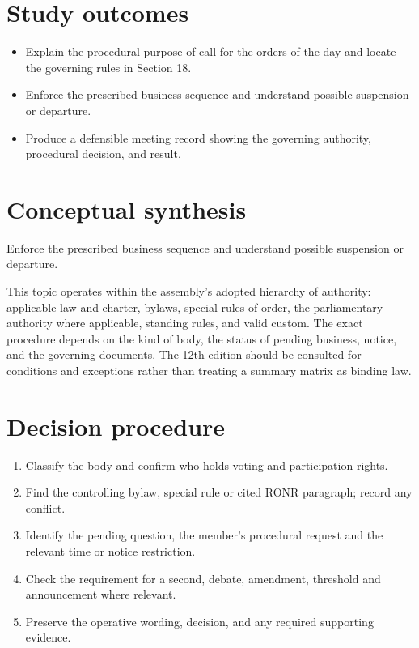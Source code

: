 \documentclass[11pt]{article}
\begin{document}
\SuiteOpen
{}
\section{Study outcomes}
\begin{itemize}[leftmargin=*,itemsep=4pt]
\item Explain the procedural purpose of call for the orders of the day and locate the governing rules in Section 18.
\item Enforce the prescribed business sequence and understand possible suspension or departure.
\item Produce a defensible meeting record showing the governing authority, procedural decision, and result.
\end{itemize}

\section{Conceptual synthesis}
Enforce the prescribed business sequence and understand possible suspension or departure.

This topic operates within the assembly’s adopted hierarchy of authority: applicable law and charter, bylaws, special rules of order, the parliamentary authority where applicable, standing rules, and valid custom. The exact procedure depends on the kind of body, the status of pending business, notice, and the governing documents. The 12th edition should be consulted for conditions and exceptions rather than treating a summary matrix as binding law.
\section{Decision procedure}
\begin{enumerate}[leftmargin=*,itemsep=4pt]
\item Classify the body and confirm who holds voting and participation rights.
\item Find the controlling bylaw, special rule or cited RONR paragraph; record any conflict.
\item Identify the pending question, the member’s procedural request and the relevant time or notice restriction.
\item Check the requirement for a second, debate, amendment, threshold and announcement where relevant.
\item Preserve the operative wording, decision, and any required supporting evidence.
\end{enumerate}
\end{document}
